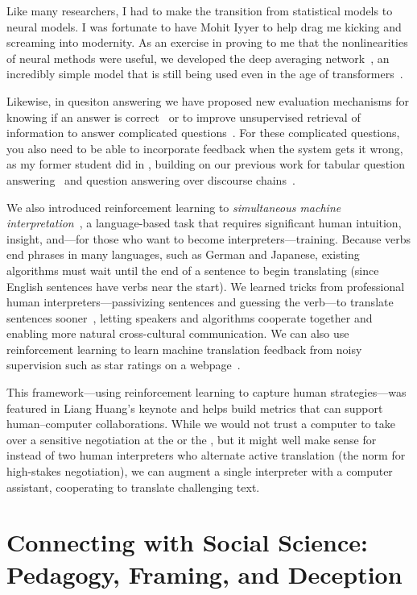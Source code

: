 Like many researchers, I had to make the transition from statistical models to neural models.
%
I was fortunate to have Mohit Iyyer to help drag me kicking and screaming into modernity.
%
As an exercise in proving to me that the nonlinearities of neural
methods were useful, we developed the deep averaging network~\cite{}, an
incredibly simple model that is still being used even in the age of
transformers~\cite{}.

Likewise, in quesiton answering we have proposed new evaluation
mechanisms for knowing if an answer is correct~\cite{si-21} or to
improve unsupervised retrieval of information to answer complicated
questions~\cite{zhao-20}.
%
For these complicated questions, you also need to be able to
incorporate feedback when the system gets it wrong, as my former
student did in \newcite{}, building on our previous work for tabular
question answering~\cite{} and question answering over discourse
chains~\cite{}.

We also introduced reinforcement learning to \emph{simultaneous
  machine interpretation}~\cite{Grissom:He:Boyd-Graber:Morgan-2014}, a
  language-based task that requires significant human intuition,
  insight, and---for those who want to become
  interpreters---training. Because verbs end phrases in many
  languages, such as German and Japanese, existing algorithms must
  wait until the end of a sentence to begin translating (since English
  sentences have verbs near the start). We learned tricks from
  professional human interpreters---passivizing sentences and guessing
  the verb---to translate sentences sooner~\cite{He-15}, letting
  speakers and algorithms cooperate together and enabling more natural
  cross-cultural communication.  We can also use reinforcement
  learning to learn machine translation feedback from noisy
  supervision such as star ratings on a webpage~\cite{nguyen-17}.

This framework---using reinforcement learning to capture human
strategies---was featured in Liang Huang's  keynote and helps
build metrics that can support human--computer collaborations.
%
While we would not trust a computer to take over a sensitive
negotiation at the  or the , but it might well make
sense for instead of two human interpreters who alternate active
translation (the norm for high-stakes negotiation), we can augment a
single interpreter with a computer assistant, cooperating to translate
challenging text.

\section{Connecting with Social Science: Pedagogy, Framing, and Deception}

